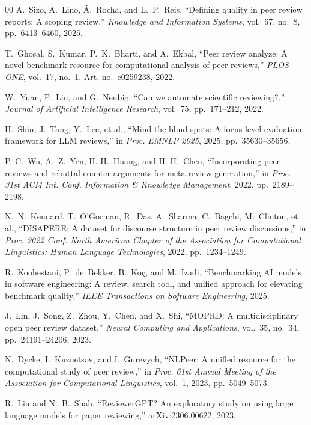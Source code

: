 \documentclass[preprint,10pt,times]{elsarticle}
\begin{document}
\begin{thebibliography}{00}
A.~Sizo, A.~Lino, \'{A}.~Rocha, and L.~P.~Reis,
``Defining quality in peer review reports: A scoping review,''
\textit{Knowledge and Information Systems}, vol.~67, no.~8, pp.~6413--6460, 2025.

T.~Ghosal, S.~Kumar, P.~K.~Bharti, and A.~Ekbal,
``Peer review analyze: A novel benchmark resource for computational analysis of peer reviews,''
\textit{PLOS ONE}, vol.~17, no.~1, Art. no.~e0259238, 2022.

W.~Yuan, P.~Liu, and G.~Neubig,
``Can we automate scientific reviewing?,''
\textit{Journal of Artificial Intelligence Research}, vol.~75, pp.~171--212, 2022.

H.~Shin, J.~Tang, Y.~Lee, et al.,
``Mind the blind spots: A focus-level evaluation framework for LLM reviews,''
in \textit{Proc. EMNLP 2025}, 2025, pp.~35630--35656.

P.-C.~Wu, A.~Z.~Yen, H.-H.~Huang, and H.-H.~Chen,
``Incorporating peer reviews and rebuttal counter-arguments for meta-review generation,''
in \textit{Proc. 31st ACM Int. Conf. Information \& Knowledge Management}, 2022, pp.~2189--2198.

N.~N.~Kennard, T.~O'Gorman, R.~Das, A.~Sharma, C.~Bagchi, M.~Clinton, et al.,
``DISAPERE: A dataset for discourse structure in peer review discussions,''
in \textit{Proc. 2022 Conf. North American Chapter of the Association for Computational Linguistics: Human Language Technologies}, 2022, pp.~1234--1249.

R.~Koohestani, P.~de~Bekker, B.~Ko\c{c}, and M.~Izadi,
``Benchmarking AI models in software engineering: A review, search tool, and unified approach for elevating benchmark quality,''
\textit{IEEE Transactions on Software Engineering}, 2025.

J.~Lin, J.~Song, Z.~Zhou, Y.~Chen, and X.~Shi,
``MOPRD: A multidisciplinary open peer review dataset,''
\textit{Neural Computing and Applications}, vol.~35, no.~34, pp.~24191--24206, 2023.

N.~Dycke, I.~Kuznetsov, and I.~Gurevych,
``NLPeer: A unified resource for the computational study of peer review,''
in \textit{Proc. 61st Annual Meeting of the Association for Computational Linguistics}, vol.~1, 2023, pp.~5049--5073.

R.~Liu and N.~B.~Shah,
``ReviewerGPT? An exploratory study on using large language models for paper reviewing,''
arXiv:2306.00622, 2023.


\end{thebibliography}
\end{document}
